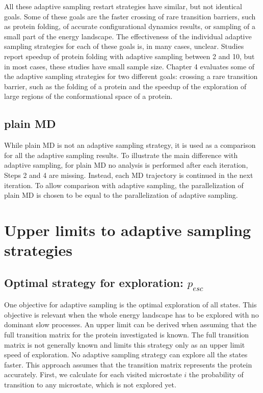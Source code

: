 All these adaptive sampling restart strategies have similar, but not identical goals.
Some of these goals are the faster crossing of rare transition barriers, such as protein folding, of accurate configurational dynamics results, or sampling of a small part of the energy landscape.
The effectiveness of the individual adaptive sampling strategies for each of these goals is, in many cases, unclear. Studies \cite{preto2014fast,weber2011characterization,bowman2010enhanced,Fabritiis-2014} report speedup of protein folding with adaptive sampling between 2 and 10, but in most cases, these studies have small sample size. Chapter 4 evaluates some of the adaptive sampling strategies for two different goals: crossing a rare transition barrier, such as the folding of a protein and the speedup of the exploration of large regions of the conformational space of a protein.

\subsection{plain MD} 

While plain MD is not an adaptive sampling strategy, it is used as a comparison for all the adaptive sampling results. To illustrate the main difference with adaptive sampling, for plain MD no analysis is performed after each iteration, Steps 2 and 4 are missing. Instead, each MD trajectory is continued in the next iteration. To allow comparison with adaptive sampling, the parallelization of plain MD is chosen to be equal to the parallelization of adaptive sampling.  

\section{Upper limits to adaptive sampling strategies}

\subsection{Optimal strategy for exploration: $p_{esc}$}

One objective for adaptive sampling is the optimal exploration of all states. This objective is relevant when the whole energy landscape has to be explored with no dominant slow processes. 
An upper limit can be derived when assuming that the full transition matrix for the protein investigated is known. The full transition matrix is not generally known and limits this strategy only as an upper limit speed of exploration. No adaptive sampling strategy can explore all the states faster. This approach assumes that the transition matrix represents the protein accurately.
First, we calculate for each visited microstate $i$ the probability of transition to any microstate, which is not explored yet.

